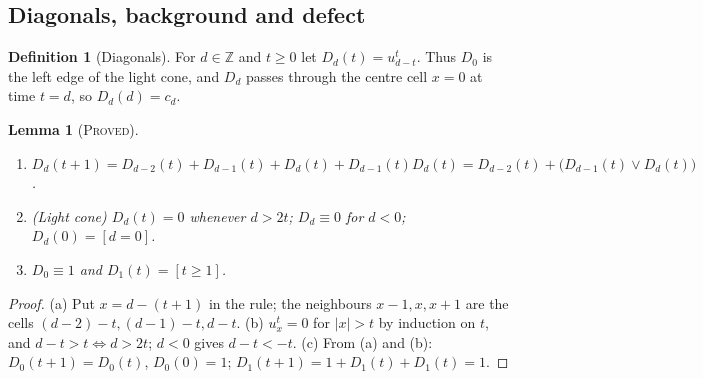 \documentclass[11pt]{article}
\newtheorem{lemma}[theorem]{Lemma}
\theoremstyle{definition}
\newtheorem{definition}[theorem]{Definition}
\theoremstyle{remark}
\newcommand{\PROVED}{\textsc{Proved}}
\begin{document}
\subsection{Diagonals, background and defect}

\begin{definition}[Diagonals]\label{fr:def:diag}
For $d\in\mathbb{Z}$ and $t\ge0$ let $D_d(t)=u^t_{d-t}$. Thus $D_0$ is the left edge of the light cone,
and $D_d$ passes through the centre cell $x=0$ at time $t=d$, so $D_d(d)=c_d$.
\end{definition}

\begin{lemma}[\PROVED]\label{fr:lem:diag}
\begin{enumerate}
\item[(a)] $D_d(t+1)=D_{d-2}(t)+D_{d-1}(t)+D_d(t)+D_{d-1}(t)D_d(t)
          =D_{d-2}(t)+\bigl(D_{d-1}(t)\vee D_d(t)\bigr)$.
\item[(b)] (Light cone) $D_d(t)=0$ whenever $d>2t$; $D_d\equiv0$ for $d<0$; $D_d(0)=[d=0]$.
\item[(c)] $D_0\equiv1$ and $D_1(t)=[t\ge1]$.
\end{enumerate}
\end{lemma}
\begin{proof}
(a) Put $x=d-(t+1)$ in the rule; the neighbours $x-1,x,x+1$ are the cells
$(d-2)-t,(d-1)-t,d-t$. (b) $u^t_x=0$ for $|x|>t$ by induction on $t$, and
$d-t>t\iff d>2t$; $d<0$ gives $d-t<-t$. (c) From (a) and (b):
$D_0(t+1)=D_0(t)$, $D_0(0)=1$; $D_1(t+1)=1+D_1(t)+D_1(t)=1$.
\end{proof}
\end{document}
